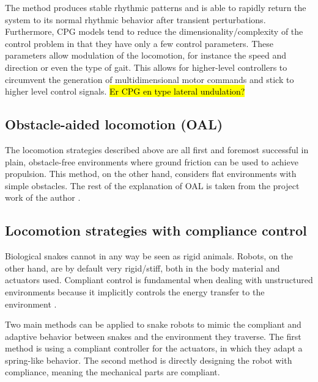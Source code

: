The method produces stable rhythmic patterns and is able to rapidly return the system to its normal rhythmic behavior after transient perturbations. Furthermore, CPG models tend to reduce the dimensionality/complexity of the control problem in that they have only a few control parameters. These parameters allow modulation of the locomotion, for instance the speed and direction or even the type of gait. This allows for higher-level controllers to circumvent the generation of multidimensional motor commands and stick to higher level control signals.
\hl{Er CPG en type lateral undulation?}

\subsection{Obstacle-aided locomotion (OAL)}\label{subsec:OAL}

The locomotion strategies described above are all first and foremost successful in plain, obstacle-free environments where ground friction can be used to achieve propulsion. This method, on the other hand, considers flat environments with simple obstacles. The rest of the explanation of OAL is taken from the project work of the author \cite{AtussaProsjektoppgp}.





\subsection{Locomotion strategies with compliance control}\label{subsec:compliance-control}

Biological snakes cannot in any way be seen as rigid animals. Robots, on the other hand, are by default very rigid/stiff, both in the body material and actuators used.
Compliant control is fundamental when dealing with unstructured environments because it implicitly controls the energy transfer to the environment \cite{calanca2015review}.

Two main methods can be applied to snake robots to mimic the compliant and adaptive behavior between snakes and the environment they traverse. The first method is using a compliant controller for the actuators, in which they adapt a spring-like behavior. The second method is directly designing the robot with compliance, meaning the mechanical parts are compliant.

